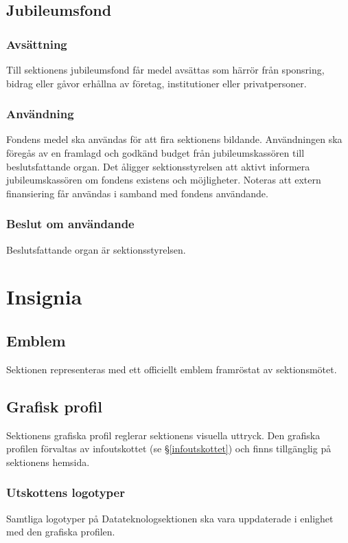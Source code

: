 \documentclass{datateknologsektionen-document}
\begin{document}
\subsection{Jubileumsfond}
\subsubsection{Avsättning}
Till sektionens jubileumsfond får medel avsättas som härrör från sponsring, bidrag
eller gåvor erhållna av företag, institutioner eller privatpersoner.

\subsubsection{Användning}
Fondens medel ska användas för att fira sektionens bildande. Användningen ska föregås
av en framlagd och godkänd budget från jubileumskassören till beslutsfattande organ. Det
åligger sektionsstyrelsen att aktivt informera jubileumskassören om fondens existens och
möjligheter. Noteras att extern finansiering får användas i samband med fondens användande.

\subsubsection{Beslut om användande}
Beslutsfattande organ är sektionsstyrelsen.

\section{Insignia}
\subsection{Emblem}
Sektionen representeras med ett officiellt emblem framröstat av sektionsmötet.

\subsection{Grafisk profil}
Sektionens grafiska profil reglerar sektionens visuella uttryck. Den grafiska
profilen förvaltas av infoutskottet (se \S \ref{infoutskottet}) och finns tillgänglig på sektionens hemsida.

\subsubsection{Utskottens logotyper}
Samtliga logotyper på Datateknologsektionen ska vara uppdaterade i enlighet med den grafiska
profilen. 
\end{document}
